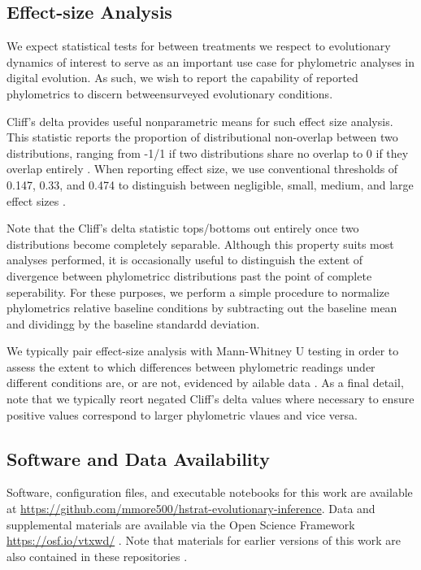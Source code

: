 \subsection{Effect-size Analysis}

We expect statistical tests for between treatments we respect to evolutionary dynamics of interest to serve as an important use case for phylometric analyses in digital evolution.
As such, we wish to report the capability of reported phylometrics to discern betweensurveyed evolutionary conditions.

Cliff's delta provides useful nonparametric means for such effect size analysis.
This statistic reports the proportion of distributional non-overlap between two distributions, ranging from -1/1 if two distributions share no overlap to 0 if they overlap entirely \citep{meissel2024using,cliff1993dominance}.
When reporting effect size, we use conventional thresholds of 0.147, 0.33, and 0.474 to distinguish between negligible, small, medium, and large effect sizes \citep{hess2004robust}.

Note that the Cliff's delta statistic tops/bottoms out entirely once two distributions become completely separable.
Although this property suits most analyses performed, it is occasionally useful to distinguish the extent of divergence between phylometricc distributions past the point of complete seperability.
For these purposes, we perform a simple procedure to normalize phylometrics relative baseline conditions by subtracting out the baseline mean and dividingg by the baseline standardd deviation.

We typically pair effect-size analysis with Mann-Whitney U testing in order to assess the extent to which differences between phylometric readings under different conditions are, or are not, evidenced by ailable data \citep{mann1947on}.
As a final detail, note that we typically reort negated Cliff's delta values where necessary to ensure positive values correspond to larger phylometric vlaues and vice versa.

\subsection{Software and Data Availability}

Software, configuration files, and executable notebooks for this work are available at \url{https://github.com/mmore500/hstrat-evolutionary-inference}.
Data and supplemental materials are available via the Open Science Framework \url{https://osf.io/vtxwd/} \citep{foster2017open}.
Note that materials for earlier versions of this work are also contained in these repositories \citep{moreno2023toward}.


